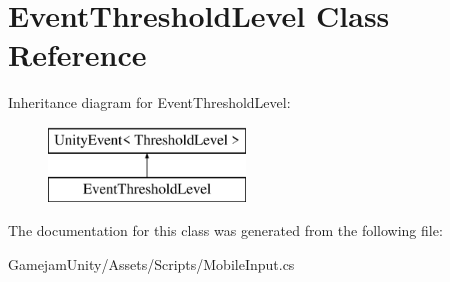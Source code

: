 \hypertarget{class_event_threshold_level}{}\section{Event\+Threshold\+Level Class Reference}
\label{class_event_threshold_level}
Inheritance diagram for Event\+Threshold\+Level\+:\begin{figure}[H]
\begin{center}
\leavevmode
\includegraphics[height=2.000000cm]{class_event_threshold_level}
\end{center}
\end{figure}


The documentation for this class was generated from the following file\+:\begin{DoxyCompactItemize}
\item 
Gamejam\+Unity/\+Assets/\+Scripts/Mobile\+Input.\+cs\end{DoxyCompactItemize}
